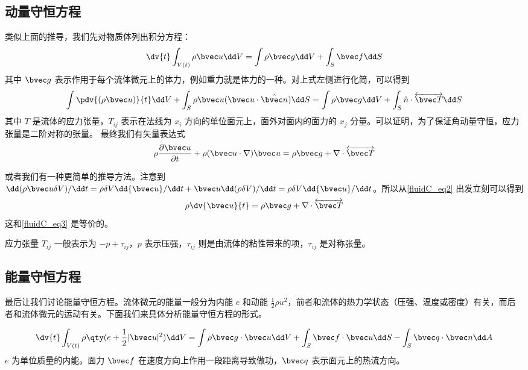 \subsection{动量守恒方程}
类似上面的推导，我们先对物质体列出积分方程：
\begin{equation}\label{fluidC_eq2}
\dv{t}\int_{V(t)} \rho \bvec u \dd V=\int \rho \bvec g\dd V+\int_S \bvec f\dd S
\end{equation}
其中 $\bvec g$ 表示作用于每个流体微元上的体力，例如重力就是体力的一种。对上式左侧进行化简，可以得到
\begin{equation}
\int \pdv{(\rho \bvec u)}{t}\dd V+\int_S\rho \bvec u (\bvec u\cdot \hat{\bvec n})\dd S=\int \rho\bvec g\dd V+\int_S \hat n\cdot \overleftrightarrow {\bvec T}\dd S
\end{equation}
其中 $T$ 是流体的应力张量，$T_{ij}$ 表示在法线为 $x_i$ 方向的单位面元上，面外对面内的面力的 $x_j$ 分量。可以证明，为了保证角动量守恒，应力张量是二阶对称的张量。
最终我们有矢量表达式
\begin{equation}\label{fluidC_eq3}
\rho \frac{\partial \bvec u}{\partial t}+\rho(\bvec u\cdot \nabla)\bvec u=\rho \bvec g+\nabla\cdot \overleftrightarrow {\bvec T}
\end{equation}

或者我们有一种更简单的推导方法。注意到 $\dd(\rho \bvec u \delta V)/\dd t=\rho \delta V \dd {\bvec u}/\dd t+\bvec u \dd (\rho \delta V)/\dd t=\rho \delta V \dd {\bvec u}/\dd t$。所以从\autoref{fluidC_eq2} 出发立刻可以得到
\begin{equation}
\rho \dv{\bvec u}{t}=\rho \bvec g+\nabla\cdot \overleftrightarrow {\bvec T}
\end{equation}
这和\autoref{fluidC_eq3} 是等价的。

应力张量 $T_{ij}$ 一般表示为 $-p+\tau_{ij}$，$p$ 表示压强，$\tau_{ij}$ 则是由流体的粘性带来的项，$\tau_{ij}$ 是对称张量。

\subsection{能量守恒方程}
最后让我们讨论能量守恒方程。流体微元的能量一般分为内能 $e$ 和动能 $\frac{1}{2}\rho u^2$，前者和流体的热力学状态（压强、温度或密度）有关，而后者和流体微元的运动有关。下面我们来具体分析能量守恒方程的形式。

\begin{equation}
\dv{t} \int_{V(t)} \rho\qty(e+\frac{1}{2}|\bvec u|^2)\dd V=\int \rho \bvec g\cdot \bvec u \dd V+\int_S \bvec f\cdot \bvec u \dd S -\int_S \bvec q\cdot \bvec n\dd A
\end{equation}
$e$ 为单位质量的内能。面力 $\bvec f$ 在速度方向上作用一段距离导致做功，$\bvec q$ 表示面元上的热流方向。

